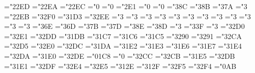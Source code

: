 \mathchardef\boxdot="22ED
\mathchardef\boxplus="22EA
\mathchardef\boxtimes="22EC
\mathchardef\square="0
\mathchardef\blacksquare="0
\mathchardef\centerdot="2\thearfam E1
\mathchardef\lozenge="0
\mathchardef\blacklozenge="0
\mathchardef\circlearrowright="3\thearfam 8C
\mathchardef\circlearrowleft="3\thearfam 8B
\mathchardef\rightleftharpoons="3\thearfam 7A
\mathchardef\leftrightharpoons="3
\mathchardef\boxminus="22EB
\mathchardef\Vdash="32F0
\mathchardef\Vvdash="31D3
\mathchardef\vDash="32EE
\mathchardef\twoheadrightarrow="3
\mathchardef\twoheadleftarrow="3
\mathchardef\leftleftarrows="3
\mathchardef\rightrightarrows="3
\mathchardef\upuparrows="3
\mathchardef\downdownarrows="3
\mathchardef\upharpoonright="3
\mathchardef\downharpoonright="3
\mathchardef\upharpoonleft="3
\mathchardef\downharpoonleft="3
\mathchardef\rightarrowtail="3
\mathchardef\leftarrowtail="3
\mathchardef\leftrightarrows="3\thearfam 6E
\mathchardef\rightleftarrows="3\thearfam 6D
\mathchardef\Lsh="3\thearfam 7B
\mathchardef\Rsh="3\thearfam 7D
\mathchardef\rightsquigarrow="3\thearfam 8E
\mathchardef\leftsquigarrow="3\thearfam 8D
\mathchardef\leftrightsquigarrow="3
\mathchardef\looparrowleft="3\thearfam 3F
\mathchardef\looparrowright="3
\mathchardef\circeq="32D0
\mathchardef\succsim="32E1
\mathchardef\gtrsim="32DD
\mathchardef\gtrapprox="31DB
\mathchardef\multimap="31C7
\mathchardef\image="31C6
\mathchardef\original="31C5
\mathchardef\therefore="3290
\mathchardef\because="3291
\mathchardef\doteqdot="32CA
\mathchardef\triangleq="32D5
\mathchardef\precsim="32E0
\mathchardef\lesssim="32DC
\mathchardef\lessapprox="31DA
\mathchardef\eqslantless="31E2
\mathchardef\eqslantgtr="31E3
\mathchardef\curlyeqprec="31E6
\mathchardef\curlyeqsucc="31E7
\mathchardef\preccurlyeq="31E4
\mathchardef\leqq="32DA
\mathchardef\leqslant="31E0
\mathchardef\lessgtr="32DE
\mathchardef\backprime="01C8
\mathchardef\axisshort="0
\mathchardef\risingdotseq="32CC
\mathchardef\fallingdotseq="32CB
\mathchardef\succcurlyeq="31E5
\mathchardef\geqq="32DB
\mathchardef\geqslant="31E1
\mathchardef\gtrless="32DF
\mathchardef\sqsubset="32E4
\mathchardef\sqsupset="32E5
\mathchardef\vartriangleright="312E
\mathchardef\vartriangleleft="312F
\mathchardef\trianglerighteq="32F5
\mathchardef\trianglelefteq="32F4
\mathchardef\bigstar="0\thearfam AB
